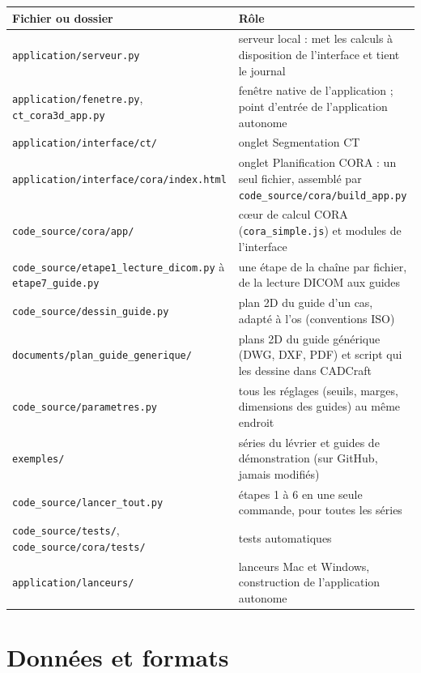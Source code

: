\documentclass[11pt,a4paper]{article}
\newcommand{\fichier}[1]{\texttt{\small #1}}
\begin{document}
\begin{longtable}{@{}p{7cm}p{8.2cm}@{}}
\toprule
\textbf{Fichier ou dossier} & \textbf{Rôle} \\ \midrule \endhead
\fichier{application/serveur.py} & serveur local : met les calculs à disposition de l'interface et tient le journal \\ \midrule
\fichier{application/fenetre.py}, \fichier{ct\_cora3d\_app.py} & fenêtre native de l'application ; point d'entrée de
  l'application autonome \\ \midrule
\fichier{application/interface/ct/} & onglet Segmentation CT \\ \midrule
\fichier{application/interface/cora/index.html} & onglet Planification CORA : un seul fichier, assemblé par
  \fichier{code\_source/cora/build\_app.py} \\ \midrule
\fichier{code\_source/cora/app/} & cœur de calcul CORA (\fichier{cora\_simple.js}) et modules de l'interface \\ \midrule
\fichier{code\_source/etape1\_lecture\_dicom.py} à \fichier{etape7\_guide.py} & une étape de la chaîne par fichier,
  de la lecture DICOM aux guides \\ \midrule
\fichier{code\_source/dessin\_guide.py} & plan 2D du guide d'un cas, adapté à l'os (conventions ISO) \\ \midrule
\fichier{documents/plan\_guide\_generique/} & plans 2D du guide générique (DWG, DXF, PDF) et script qui les dessine
  dans CADCraft \\ \midrule
\fichier{code\_source/parametres.py} & tous les réglages (seuils, marges, dimensions des guides) au même endroit \\ \midrule
\fichier{exemples/} & séries du lévrier et guides de démonstration (sur GitHub, jamais modifiés) \\ \midrule
\fichier{code\_source/lancer\_tout.py} & étapes 1 à 6 en une seule commande, pour toutes les séries \\ \midrule
\fichier{code\_source/tests/}, \fichier{code\_source/cora/tests/} & tests automatiques \\ \midrule
\fichier{application/lanceurs/} & lanceurs Mac et Windows, construction de l'application autonome \\
\bottomrule
\end{longtable}

\section{Données et formats}
\end{document}

